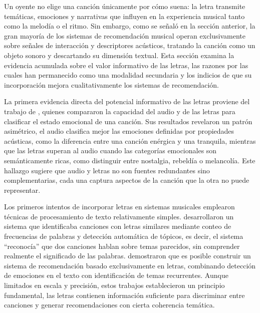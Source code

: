 Un oyente no elige una canción únicamente por cómo suena: la letra transmite temáticas, emociones y narrativas que influyen en la experiencia musical tanto como la melodía o el ritmo. Sin embargo, como se señaló en la sección anterior, la gran mayoría de los sistemas de recomendación musical operan exclusivamente sobre señales de interacción y descriptores acústicos, tratando la canción como un objeto sonoro y descartando su dimensión textual. Esta sección examina la evidencia acumulada sobre el valor informativo de las letras, las razones por las cuales han permanecido como una modalidad secundaria y los indicios de que su incorporación mejora cualitativamente los sistemas de recomendación.

La primera evidencia directa del potencial informativo de las letras proviene del trabajo de \textcite{hu_2010_lyrics_audio_mood}, quienes compararon la capacidad del audio y de las letras para clasificar el estado emocional de una canción. Sus resultados revelaron un patrón asimétrico, el audio clasifica mejor las emociones definidas por propiedades acústicas, como la diferencia entre una canción enérgica y una tranquila, mientras que las letras superan al audio cuando las categorías emocionales son semánticamente ricas, como distinguir entre nostalgia, rebeldía o melancolía. Este hallazgo sugiere que audio y letras no son fuentes redundantes sino complementarias, cada una captura aspectos de la canción que la otra no puede representar.

Los primeros intentos de incorporar letras en sistemas musicales emplearon técnicas de procesamiento de texto relativamente simples. \textcite{patra_2013_lyrics_retrieval} desarrollaron un sistema que identificaba canciones con letras similares mediante conteo de frecuencias de palabras y detección automática de tópicos, es decir, el sistema ``reconocía'' que dos canciones hablan sobre temas parecidos, sin comprender realmente el significado de las palabras. \textcite{gossi_2016_lyric_recommendation} demostraron que es posible construir un sistema de recomendación basado exclusivamente en letras, combinando detección de emociones en el texto con identificación de temas recurrentes. Aunque limitados en escala y precisión, estos trabajos establecieron un principio fundamental, las letras contienen información suficiente para discriminar entre canciones y generar recomendaciones con cierta coherencia temática.

